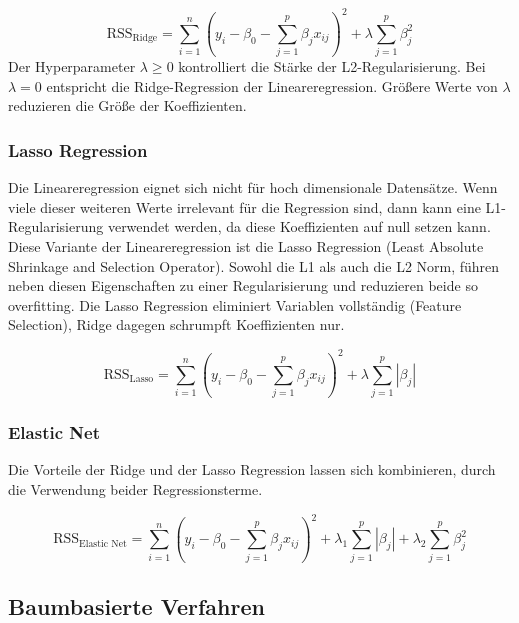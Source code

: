 \begin{equation}
\text{RSS}_{\text{Ridge}} = \sum_{i=1}^{n}(y_i - \beta_0 - \sum_{j=1}^{p}\beta_j x_{ij})^2 + \lambda \sum_{j=1}^{p}\beta_j^2
\label{eq:rss-ridge}
\end{equation}
Der Hyperparameter \(\lambda \geq 0\) kontrolliert die Stärke der L2-Regularisierung. Bei \(\lambda = 0\) entspricht die Ridge-Regression der Lineareregression. Größere Werte von \(\lambda \) reduzieren die Größe der Koeffizienten. \cite{Hastie2009}

\subsubsection{Lasso Regression}
Die Lineareregression eignet sich nicht für hoch dimensionale Datensätze. Wenn viele dieser weiteren Werte irrelevant für die Regression sind, dann kann eine L1-Regularisierung verwendet werden, da diese Koeffizienten auf null setzen kann. Diese Variante der Lineareregression ist die Lasso Regression (Least Absolute Shrinkage and Selection Operator). Sowohl die L1 als auch die L2 Norm, führen neben diesen Eigenschaften zu einer Regularisierung und reduzieren beide so overfitting. Die Lasso Regression eliminiert Variablen vollständig (Feature Selection), Ridge dagegen schrumpft Koeffizienten nur. \cite{Hastie2009}

\begin{equation}
\text{RSS}_{\text{Lasso}} = \sum_{i=1}^{n}(y_i - \beta_0 - \sum_{j=1}^{p}\beta_j x_{ij})^2 + \lambda \sum_{j=1}^{p}|\beta_j|
\label{eq:reg-lasso}
\end{equation}

\subsubsection{Elastic Net}
Die Vorteile der Ridge und der Lasso Regression lassen sich kombinieren, durch die Verwendung beider Regressionsterme. \cite{Hastie2009}

\begin{equation}
\text{RSS}_{\text{Elastic Net}} = \sum_{i=1}^{n}(y_i - \beta_0 - \sum_{j=1}^{p}\beta_j x_{ij})^2 + \lambda_1 \sum_{j=1}^{p}|\beta_j| + \lambda_2 \sum_{j=1}^{p}\beta_j^2
\label{eq:reg-elastic}
\end{equation}

\subsection{Baumbasierte Verfahren}

